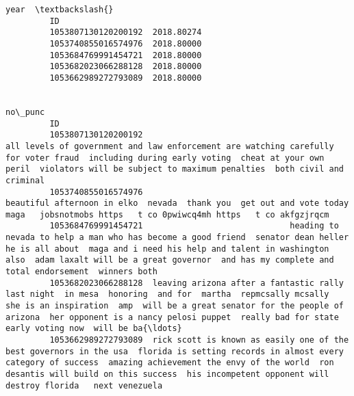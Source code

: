 \documentclass[11pt]{article}
\begin{document}
\begin{Verbatim}[commandchars=\\\{\}]
                                    year  \textbackslash{}
         ID                                
         1053807130120200192  2018.80274   
         1053740855016574976  2018.80000   
         1053684769991454721  2018.80000   
         1053682023066288128  2018.80000   
         1053662989272793089  2018.80000   
         
                                                                                                                                                                                                                                                                                                              no\_punc  
         ID                                                                                                                                                                                                                                                                                                            
         1053807130120200192                                                                    all levels of government and law enforcement are watching carefully for voter fraud  including during early voting  cheat at your own peril  violators will be subject to maximum penalties  both civil and criminal   
         1053740855016574976                                                                                                                                             beautiful afternoon in elko  nevada  thank you  get out and vote today    maga   jobsnotmobs https   t co 0pwiwcq4mh https   t co akfgzjrqcm  
         1053684769991454721                              heading to nevada to help a man who has become a good friend  senator dean heller  he is all about  maga and i need his help and talent in washington  also  adam laxalt will be a great governor  and has my complete and total endorsement  winners both   
         1053682023066288128  leaving arizona after a fantastic rally last night  in mesa  honoring  and for  martha  repmcsally mcsally  she is an inspiration  amp  will be a great senator for the people of arizona  her opponent is a nancy pelosi puppet  really bad for state  early voting now  will be ba{\ldots}  
         1053662989272793089  rick scott is known as easily one of the best governors in the usa  florida is setting records in almost every category of success  amazing achievement the envy of the world  ron desantis will build on this success  his incompetent opponent will destroy florida   next venezuela   
\end{Verbatim}
            
\end{document}
